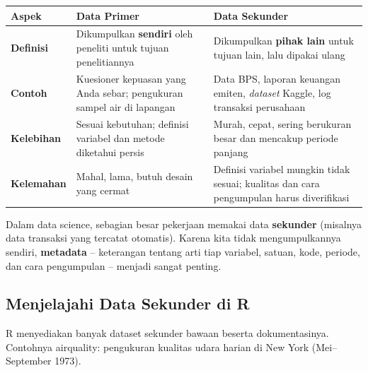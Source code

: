 \documentclass[
  indonesian,
  letterpaper,
]{book}
\newcounter{none} %
\begin{document}
{\def\LTcaptype{none} %
\begin{longtable}[]{@{}
  >{\raggedright\arraybackslash}p{}
  >{\raggedright\arraybackslash}p{}
  >{\raggedright\arraybackslash}p{}@{}}
\toprule\noalign{}
\begin{minipage}[b]{\linewidth}\raggedright
Aspek
\end{minipage} & \begin{minipage}[b]{\linewidth}\raggedright
Data Primer
\end{minipage} & \begin{minipage}[b]{\linewidth}\raggedright
Data Sekunder
\end{minipage} \\
\midrule\noalign{}
\endhead
\bottomrule\noalign{}
\endlastfoot
\textbf{Definisi} & Dikumpulkan \textbf{sendiri} oleh peneliti untuk
tujuan penelitiannya & Dikumpulkan \textbf{pihak lain} untuk tujuan
lain, lalu dipakai ulang \\
\textbf{Contoh} & Kuesioner kepuasan yang Anda sebar; pengukuran sampel
air di lapangan & Data BPS, laporan keuangan emiten, \emph{dataset}
Kaggle, log transaksi perusahaan \\
\textbf{Kelebihan} & Sesuai kebutuhan; definisi variabel dan metode
diketahui persis & Murah, cepat, sering berukuran besar dan mencakup
periode panjang \\
\textbf{Kelemahan} & Mahal, lama, butuh desain yang cermat & Definisi
variabel mungkin tidak sesuai; kualitas dan cara pengumpulan harus
diverifikasi \\
\end{longtable}
}

Dalam data science, sebagian besar pekerjaan memakai data
\textbf{sekunder} (misalnya data transaksi yang tercatat otomatis).
Karena kita tidak mengumpulkannya sendiri, \textbf{metadata} --
keterangan tentang arti tiap variabel, satuan, kode, periode, dan cara
pengumpulan -- menjadi sangat penting.

\subsection{Menjelajahi Data Sekunder di
R}\label{menjelajahi-data-sekunder-di-r}

R menyediakan banyak dataset sekunder bawaan beserta dokumentasinya.
Contohnya airquality: pengukuran kualitas udara harian di New York
(Mei--September 1973).
\end{document}
